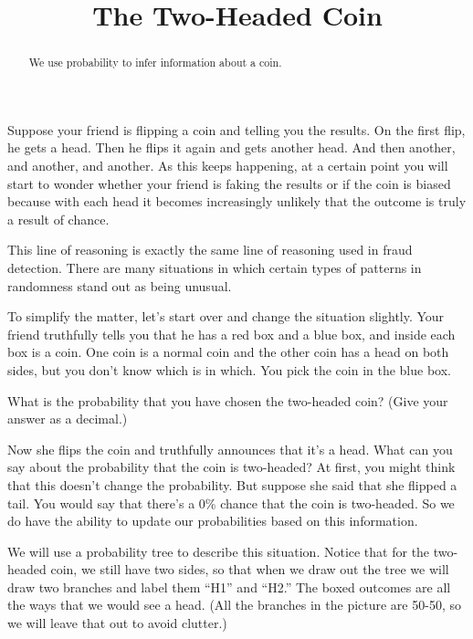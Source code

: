 \documentclass{ximera}
\title{The Two-Headed Coin}
\begin{document}
\begin{abstract}
We use probability to infer information about a coin.
\end{abstract}
\maketitle

Suppose your friend is flipping a coin and telling you the results. On the first flip, he gets a head. Then he flips it again and gets another head. And then another, and another, and another. As this keeps happening, at a certain point you will start to wonder whether your friend is faking the results or if the coin is biased because with each head it becomes increasingly unlikely that the outcome is truly a result of chance.

This line of reasoning is exactly the same line of reasoning used in fraud detection. There are many situations in which certain types of patterns in randomness stand out as being unusual.

To simplify the matter, let's start over and change the situation slightly. Your friend truthfully tells you that he has a red box and a blue box, and inside each box is a coin. One coin is a normal coin and the other coin has a head on both sides, but you don't know which is in which. You pick the coin in the blue box.

\begin{question}
What is the probability that you have chosen the two-headed coin? (Give your answer as a decimal.)


\end{question}

Now she flips the coin and truthfully announces that it's a head. What can you say about the probability that the coin is two-headed? At first, you might think that this doesn't change the probability. But suppose she said that she flipped a tail. You would say that there's a 0\% chance that the coin is two-headed. So we do have the ability to update our probabilities based on this information.

We will use a probability tree to describe this situation. Notice that for the two-headed coin, we still have two sides, so that when we draw out the tree we will draw two branches and label them ``H1'' and ``H2.'' The boxed outcomes are all the ways that we would see a head. (All the branches in the picture are 50-50, so we will leave that out to avoid clutter.)
\end{document}
